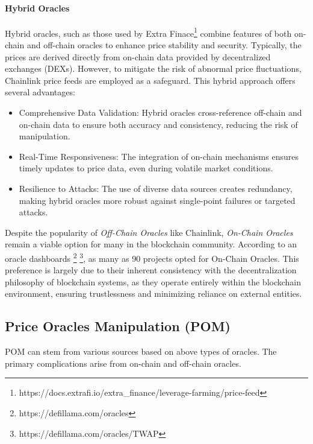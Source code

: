     \paragraph{Hybrid Oracles} Hybrid oracles, such as those used by Extra Finace\footnote{https://docs.extrafi.io/extra\_finance/leverage-farming/price-feed} combine features of both on-chain and off-chain oracles to enhance price stability and security. Typically, the prices are derived directly from on-chain data provided by decentralized exchanges (DEXs). 
    However, to mitigate the risk of abnormal price fluctuations, Chainlink price feeds are employed as a safeguard. 
    This hybrid approach offers several advantages:

    \begin{itemize}
        \item Comprehensive Data Validation: Hybrid oracles cross-reference off-chain and on-chain data to ensure both accuracy and consistency, reducing the risk of manipulation.
        \item Real-Time Responsiveness: The integration of on-chain mechanisms ensures timely updates to price data, even during volatile market conditions.
        \item Resilience to Attacks: The use of diverse data sources creates redundancy, making hybrid oracles more robust against single-point failures or targeted attacks.
    \end{itemize}

    Despite the popularity of \textit{Off-Chain Oracles} like Chainlink, \textit{On-Chain Oracles} remain a viable option for many in the blockchain community. 
    According to an oracle dashboards \footnote{https://defillama.com/oracles} \footnote{https://defillama.com/oracles/TWAP}, as many as 90 projects opted for On-Chain Oracles.
    This preference is largely due to their inherent consistency with the decentralization philosophy of blockchain systems, as they operate entirely within the blockchain environment, ensuring trustlessness and minimizing reliance on external entities.


\subsection{Price Oracles Manipulation (POM)}
POM can stem from various sources based on above types of oracles. The primary complications arise from on-chain and off-chain oracles.
